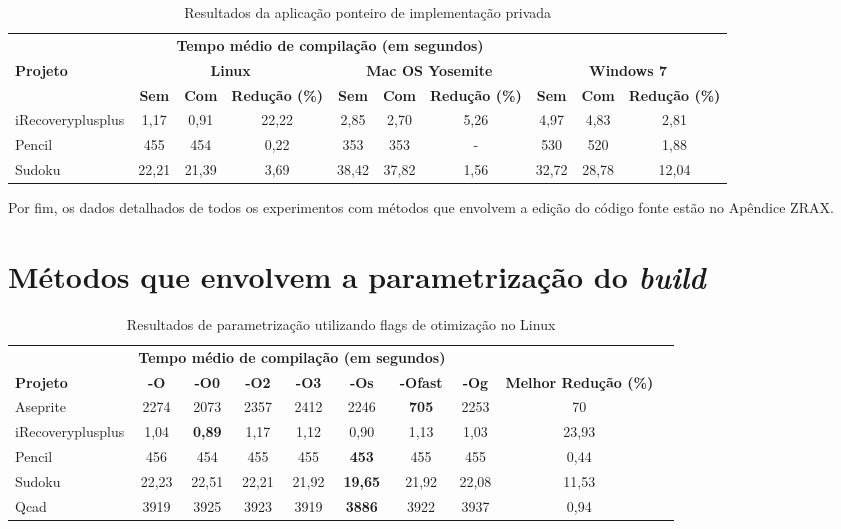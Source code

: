 \begin{table}[!ht]
\tiny
\centering
\caption{Resultados da aplicação ponteiro de implementação privada }
\label{tab:pimpl}
\begin{tabular}{lccccccccc}
& \multicolumn{6}{c}{\textbf{Tempo médio de compilação (em segundos)} } \\
\textbf{Projeto} & \multicolumn{3}{c}{\textbf{Linux}} & \multicolumn{3}{c}{\textbf{Mac OS Yosemite}} & \multicolumn{3}{c}{\textbf{Windows 7}} \\ 
& \textbf{Sem } & \textbf{Com }  & \textbf{Redução (\%)} & \textbf{Sem } & \textbf{Com }  & \textbf{Redução (\%)} & \textbf{Sem } & \textbf{Com }  & \textbf{Redução (\%)} \\
\toprule
iRecoveryplusplus  &   1,17   &  0,91   & 22,22   & 2,85  & 2,70   & 5,26  & 4,97 & 4,83 & 2,81 \\ 
Pencil             &   455    &  454    & 0,22    & 353   & 353    & -     & 530 & 520   & 1,88 \\
Sudoku             &   22,21  & 21,39   & 3,69    & 38,42 & 37,82  & 1,56  & 32,72 & 28,78 & 12,04 \\ 
\end{tabular}
\end{table}

Por fim, os dados detalhados de todos os experimentos com métodos que envolvem a edição do código fonte estão no Apêndice ZRAX.

\section{Métodos que envolvem a parametrização do \textit{build}}


\begin{table}[!ht]
\tiny
\centering
\caption{Resultados de parametrização utilizando flags de otimização no Linux}
\label{tab:flags_otimizacao:linux}
\begin{tabular}{lccccccccc}
& \multicolumn{6}{c}{\textbf{Tempo médio de compilação (em segundos)} } \\
 \textbf{Projeto}& \textbf{-O}  & \textbf{-O0}   & \textbf{-O2} & \textbf{-O3} & \textbf{-Os} & \textbf{-Ofast} & \textbf{-Og} & \textbf{Melhor Redução (\%)}\\ \toprule
Aseprite  & 2274 & 2073  & 2357 & 2412 & 2246 & \textbf{705} & 2253 & 70 \\
iRecoveryplusplus   & 1,04 & \textbf{0,89} &  1,17 & 1,12 & 0,90 & 1,13 & 1,03 & 23,93 \\
Pencil  & 456 & 454 &  455 & 455 & \textbf{453} & 455 & 455 & 0,44\\
Sudoku  & 22,23  & 22,51  & 22,21 & 21,92 & \textbf{19,65} & 21,92 & 22,08 &  11,53 \\ 
Qcad    & 3919 &  3925 &  3923 & 3919 & \textbf{3886} & 3922 & 3937 & 0,94  \\ 
\end{tabular}
\end{table}



